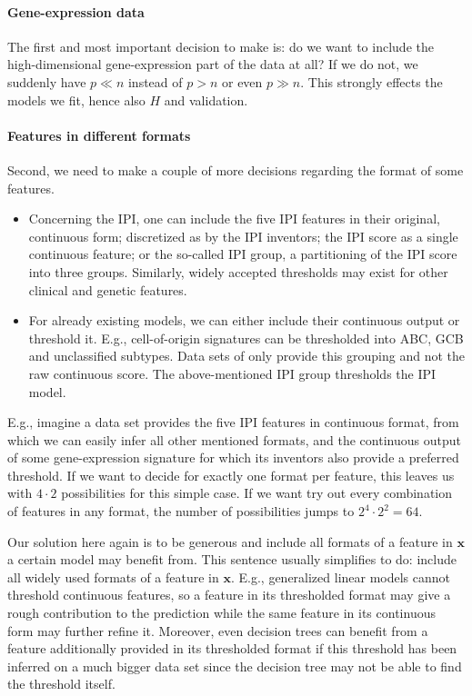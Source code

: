 \paragraph{Gene-expression data}
The first and most important decision to make is: do we want to include the high-dimensional
gene-expression part of the data at all? If we do not, we suddenly have $p \ll n$ instead of 
$p > n$ or even $p \gg n$. This strongly effects the models we fit, hence also $H$ and 
validation.

\paragraph{Features in different formats}
Second, we need to make a couple of more decisions regarding the format of some features.
\begin{itemize}
    \item Concerning the IPI, one can include the five IPI features in their original, continuous 
        form; discretized as by the IPI inventors; the IPI score as a single continuous feature; 
        or the so-called IPI group, a partitioning of the IPI score into three groups. Similarly, 
        widely accepted thresholds may exist for other clinical and genetic features.
    \item For already existing models, we can either include their continuous output or threshold 
        it. E.g., cell-of-origin signatures can be thresholded into ABC, GCB and unclassified 
        subtypes. Data sets of only provide this grouping and not the raw continuous score. The 
        above-mentioned IPI group thresholds the IPI model. 
\end{itemize}

E.g., imagine a data set provides the five IPI features in continuous format, from which we can 
easily infer all other mentioned formats, and the continuous output of some gene-expression 
signature for which its inventors also provide a preferred threshold. If we want to decide for 
exactly one format per feature, this leaves us with $4 \cdot 2$ possibilities for this simple case. 
If we want try out every combination of features in any format, the number of possibilities jumps to 
$2^4 \cdot 2^2 = 64$. 

Our solution here again is to be generous and include all formats of a feature in $\mathbf{x}$ a 
certain model may benefit from. This sentence usually 
simplifies to do: include all widely used formats of a feature in $\mathbf{x}$. E.g., generalized 
linear models cannot threshold continuous features, so a feature in its thresholded format may give 
a rough contribution to the prediction while the same feature in its continuous form may further 
refine it. Moreover, even decision trees can benefit from a feature additionally provided in its 
thresholded format if this threshold has been inferred on a much bigger data set since the decision 
tree may not be able to find the threshold itself.


